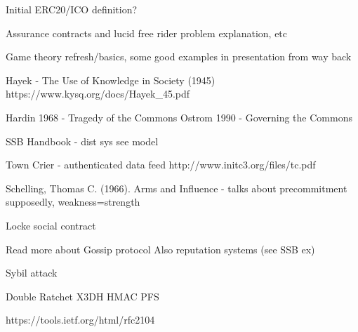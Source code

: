 \documentclass[12pt]{report}
\begin{document}
Initial ERC20/ICO definition?

Assurance contracts and lucid free rider problem explanation, etc

Game theory refresh/basics, some good examples in presentation from way back

Hayek - The Use of Knowledge in Society (1945) https://www.kysq.org/docs/Hayek_45.pdf

Hardin 1968 - Tragedy of the Commons
Ostrom 1990 - Governing the Commons

SSB Handbook - dist sys see model

Town Crier - authenticated data feed http://www.initc3.org/files/tc.pdf

Schelling, Thomas C. (1966). Arms and Influence - talks about precommitment supposedly, weakness=strength

Locke social contract

Read more about Gossip protocol
Also reputation systems (see SSB ex)

Sybil attack

Double Ratchet X3DH HMAC PFS

https://tools.ietf.org/html/rfc2104
\end{document}
